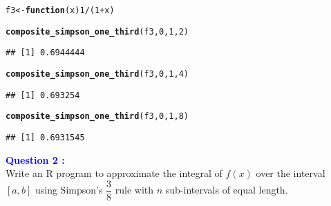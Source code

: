 \documentclass[11pt, a4paper]{article}\usepackage[]{graphicx}\usepackage[]{xcolor}
\makeatletter
\newcommand{\hlnum}[1]{\textcolor[rgb]{0.686,0.059,0.569}{#1}}%
\newcommand{\hlopt}[1]{\textcolor[rgb]{0,0,0}{#1}}%
\newcommand{\hldef}[1]{\textcolor[rgb]{0.345,0.345,0.345}{#1}}%
\newcommand{\hlkwa}[1]{\textcolor[rgb]{0.161,0.373,0.58}{\textbf{#1}}}%
\newcommand{\hlkwb}[1]{\textcolor[rgb]{0.69,0.353,0.396}{#1}}%
\newcommand{\hlkwc}[1]{\textcolor[rgb]{0.333,0.667,0.333}{#1}}%
\newcommand{\hlkwd}[1]{\textcolor[rgb]{0.737,0.353,0.396}{\textbf{#1}}}%
\newenvironment{kframe}{%
 \def\at@end@of@kframe{}%
 \ifinner\ifhmode%
  \def\at@end@of@kframe{\end{minipage}}%
  \begin{minipage}{\columnwidth}%
 \fi\fi%
 \def\FrameCommand##1{\hskip\@totalleftmargin \hskip-\fboxsep
 \colorbox{shadecolor}{##1}\hskip-\fboxsep
     \hskip-\linewidth \hskip-\@totalleftmargin \hskip\columnwidth}%
 \MakeFramed {\advance\hsize-\width
   \@totalleftmargin\z@ \linewidth\hsize
   \@setminipage}}%
 {\par\unskip\endMakeFramed%
 \at@end@of@kframe}
\newenvironment{knitrout}{}{} %
\makeatother
\begin{document}
\begin{knitrout}
\color{fgcolor}\begin{kframe}
\begin{alltt}
\hldef{f3} \hlkwb{<-} \hlkwa{function}\hldef{(}\hlkwc{x}\hldef{)} \hlnum{1} \hlopt{/} \hldef{(}\hlnum{1} \hlopt{+} \hldef{x)}

\hlkwd{composite_simpson_one_third}\hldef{(f3,} \hlnum{0}\hldef{,} \hlnum{1}\hldef{,} \hlnum{2}\hldef{)}
\end{alltt}
\begin{verbatim}
## [1] 0.6944444
\end{verbatim}
\end{kframe}
\end{knitrout}

\begin{knitrout}
\color{fgcolor}\begin{kframe}
\begin{alltt}
\hlkwd{composite_simpson_one_third}\hldef{(f3,} \hlnum{0}\hldef{,} \hlnum{1}\hldef{,} \hlnum{4}\hldef{)}
\end{alltt}
\begin{verbatim}
## [1] 0.693254
\end{verbatim}
\end{kframe}
\end{knitrout}

\begin{knitrout}
\color{fgcolor}\begin{kframe}
\begin{alltt}
\hlkwd{composite_simpson_one_third}\hldef{(f3,} \hlnum{0}\hldef{,} \hlnum{1}\hldef{,} \hlnum{8}\hldef{)}
\end{alltt}
\begin{verbatim}
## [1] 0.6931545
\end{verbatim}
\end{kframe}
\end{knitrout}

\smallpencil \hspace{0.2cm} \textcolor{blue}{\textbf{Question 2 : }} \\

\hspace{1cm} Write an R program to approximate the integral of $f(x)$ over the interval $[a, b]$ using Simpson's $\dfrac{3}{8}$ rule with $n$ sub-intervals of equal length.
\end{document}
